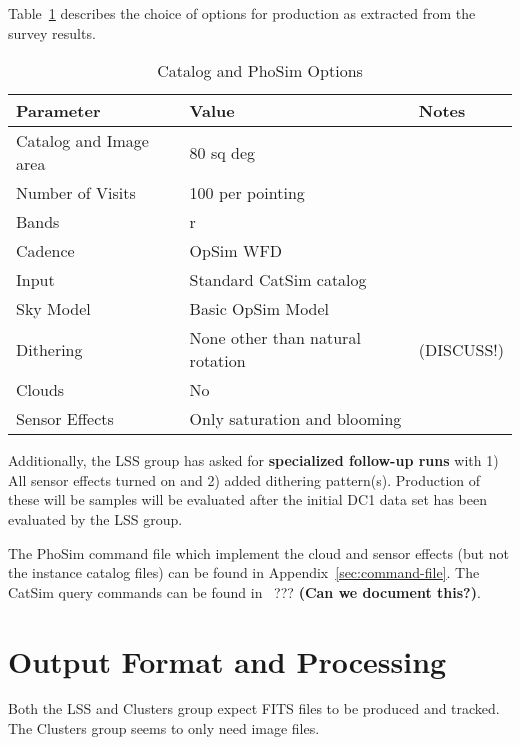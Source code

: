\documentclass[12pt,letterpaper]{article}
\begin{document}
Table~\ref{tab:phosim-options} describes the choice of options for
production as extracted from the survey results.

\begin{table}[!htb]
  \begin{tabular}{| l| l| p{3cm} | }
    \hline 
    Parameter                       & Value   & Notes  \\
    \hline
    Catalog and Image area  & 80 sq deg & \\
    Number of Visits            & 100 per pointing & \\
    Bands                             & r  &    \\
    Cadence                         & OpSim WFD  & \\
    Input                              & Standard CatSim catalog & \\
    Sky Model                      & Basic OpSim Model & \\
    Dithering                       & None other than natural rotation&  (DISCUSS!)  \\
    Clouds                           & No & \\
    Sensor Effects                & Only saturation and blooming& \\
    \hline
  \end{tabular}
  \caption{Catalog and PhoSim Options}
  \label{tab:phosim-options}
\end{table}

Additionally, the LSS group has asked for {\bf specialized follow-up
  runs} with 1) All sensor effects turned on and 2) added dithering
pattern(s).  Production of these will be samples will be evaluated
after the initial DC1 data set has been evaluated by the LSS group.

The PhoSim command file which implement the cloud and sensor effects (but not the
instance catalog files) can be found in Appendix~\ref{sec:command-file}.  The
CatSim query commands can be found in~ ??? {\bf (Can we document this?)}.

\section{Output Format and Processing}

Both the LSS and Clusters group expect FITS files to be produced and
tracked.  The Clusters group seems to only need image files.  \\
\end{document}
